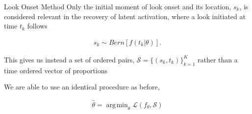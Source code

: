 \documentclass{beamer}
\DeclareMathOperator*{\argmin}{arg\!\min}
\begin{document}
\begin{frame}{Look Onset Method}
Only the initial moment of look onset and its location, $s_k$, is considered relevant in the recovery of latent activation, where a look initiated at time $t_k$ follows 
\vspace{-4mm}

\begin{align*}
s_k \sim Bern \left[f(t_k | \theta)\right].
\end{align*}

This gives us instead a set of ordered pairs, $\mathcal{S} = \{(s_k, t_k)\}_{k=1}^K$ rather than a time ordered vector of proportions  \vspace{4mm}

We are able to use an identical procedure as before, 

\begin{align*}
\hat{\theta} = \argmin_{\theta} \mathcal{L}(f_{\theta}, \mathcal{S})
\end{align*}

\end{frame}
\end{document}
